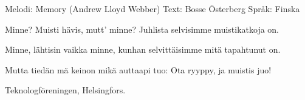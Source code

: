 \begin{song}

\begin{songmeta}
Melodi: Memory (Andrew Lloyd Webber)
Text: Bosse Österberg
Språk: Finska
\end{songmeta}

\begin{songtext}
Minne? Muisti hävis, mutt' minne?
Juhlista selvisimme
muistikatkoja on.

Minne, lähtisin vaikka minne,
kunhan selvittäisimme
mitä tapahtunut on.

Mutta tiedän
mä keinon mikä auttaapi tuo:
Ota ryyppy, ja muistis juo!
\end{songtext}

\begin{songnotes}
Teknologföreningen, Helsingfors.
\end{songnotes}
\end{song}
